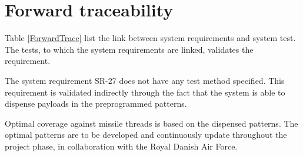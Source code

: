 \documentclass[Main]{subfiles}
\begin{document}
\chapter{Forward traceability}
Table \ref{ForwardTrace} list the link between system requirements and system test. 
The tests, to which the system requirements are linked, validates the requirement. 

The system requirement SR-27 does not have any test method specified. 
This requirement is validated indirectly through the fact that the system is able to dispense payloads in the preprogrammed patterns.

Optimal coverage against missile threads is based on the dispensed patterns. 
The optimal patterns are to be developed and continuously update throughout the project phase, in collaboration with the Royal Danish Air Force.\\
\end{document}
